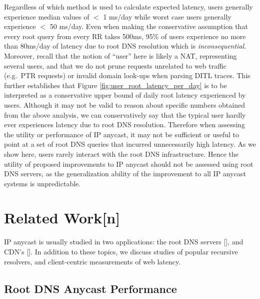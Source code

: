 \documentclass[sigconf,nonacm,10pt]{acmart}
\begin{document}
Regardless of which method is used to calculate expected latency, users
generally experience median values of \(<\) 1 ms/day while worst case
users generally experience \(<\) 50 ms/day. Even when making the
conservative assumption that every root query from every RR takes 500ms,
95\% of users experience no more than 80ms/day of latency due to root
DNS resolution which is \textit{inconsequential}. Moreover, recall that
the notion of ``user'' here is likely a NAT, representing several users,
and that we do not prune requests unrelated to web traffic (e.g.~PTR
requests) or invalid domain look-ups when parsing DITL traces. This
further establishes that Figure \ref{fig:user_root_latency_per_day} is
to be interpreted as a conservative upper bound of daily root latency
experienced by users. Although it may not be valid to reason about
specific numbers obtained from the above analysis, we can conservatively
say that the typical user hardly ever experiences latency due to root
DNS resolution. Therefore when assessing the utility or performance of
IP anycast, it may not be sufficient or useful to point at a set of root
DNS queries that incurred unnecessarily high latency. As we show here,
users rarely interact with the root DNS infrastructure. Hence the
utility of proposed improvements to IP anycast should not be assessed
using root DNS servers, as the generalization ability of the improvement
to all IP anycast systems is unpredictable.

\section{Related Work{[}n{]}}\label{related-workn}

IP anycast is usually studied in two applications: the root DNS servers
{[}{]}, and CDN's {[}{]}. In addition to these topics, we discuss
studies of popular recursive resolvers, and client-centric measurements
of web latency.

\subsection{Root DNS Anycast
Performance}\label{root-dns-anycast-performance}
\end{document}
